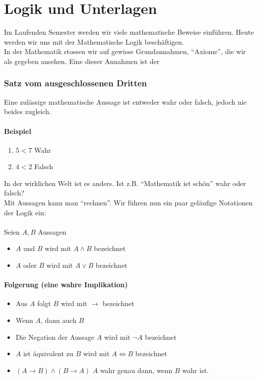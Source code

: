 \chapter{Logik und Unterlagen}
Im Laufenden Semester werden wir viele mathematische Beweise einführen. Heute werden wir uns mit der Mathematische Logik beschäftigen. \\

In der Mathematik stossen wir auf gewisse Grundannahmen, ``Axiome'', die wir als gegeben ansehen. Eine dieser Annahmen ist der 
\subsection*{Satz vom ausgeschlossenen Dritten}
Eine zulässige mathematische Aussage ist entweder wahr oder falsch, jedoch nie beides zugleich.
\subsubsection*{Beispiel}
\begin{enumerate}
	\item $5<7$ Wahr
	\item $4<2$ Falsch
\end{enumerate}
In der wirklichen Welt ist es anders. Ist z.B. ``Mathematik ist schön'' wahr oder falsch?\\

Mit Aussagen kann man ``rechnen''. Wir führen nun ein paar geläufige Notationen der Logik ein:\\
\\
Seien $A,B$ Aussagen
\begin{itemize}
\item $A$ und $B$ wird mit $A\land B$ bezeichnet
\item $A$ oder $B$ wird mit $A\lor B$ bezeichnet
\end{itemize}
\subsubsection*{Folgerung (eine wahre Implikation)}
\begin{itemize}
\item Aus $A$ folgt $B$ wird mit $\to$ bezeichnet
\item Wenn $A$, dann auch $B$
\item Die Negation der Aussage $A$ wird mit $\lnot A$ bezeichnet
\item $A$ ist äquivalent zu $B$ wird mit $A\Leftrightarrow B$ bezeichnet
\item $\left(A\to B\right)\land \left( B\to A\right)$ $A$ wahr genau dann, wenn $B$ wahr ist.
\end{itemize}

